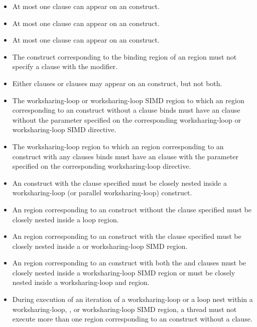 \begin{itemize}
\item At most one  clause can appear on an  construct.

\item At most one  clause can appear on an  construct.

\item At most one  clause can appear on an  construct.

\item The construct corresponding to the binding region of an 
    region must not specify a  clause with the 
    modifier.

\item Either {} clauses or 
clauses may appear on an  construct, but not both.

\item The worksharing-loop or worksharing-loop SIMD region to which an 
region corresponding to an  construct without a 
clause binds must have an  clause without the parameter
specified on the corresponding worksharing-loop or worksharing-loop SIMD directive.

\item The worksharing-loop region to which an  region corresponding to an
 construct with any 
clauses binds must have an  clause with the parameter specified
on the corresponding worksharing-loop directive.

\item An  construct with the  clause specified must
be closely nested inside a worksharing-loop (or parallel worksharing-loop) construct.

\item An  region corresponding to an  construct
without the  clause specified must be closely nested inside a
loop region.

\item An  region corresponding to an  construct with
the  clause specified must be closely nested inside a
 or worksharing-loop SIMD region.

\item An  region corresponding to an  construct with
  both the  and  clauses must be closely nested inside
  a worksharing-loop SIMD region or must be closely nested inside a
    worksharing-loop and 
  region.

\item During execution of an iteration of a worksharing-loop or a loop nest
  within a worksharing-loop, , or worksharing-loop SIMD
region, a thread must not execute more than one  region
corresponding to an  construct without a  clause.
\end{itemize}
